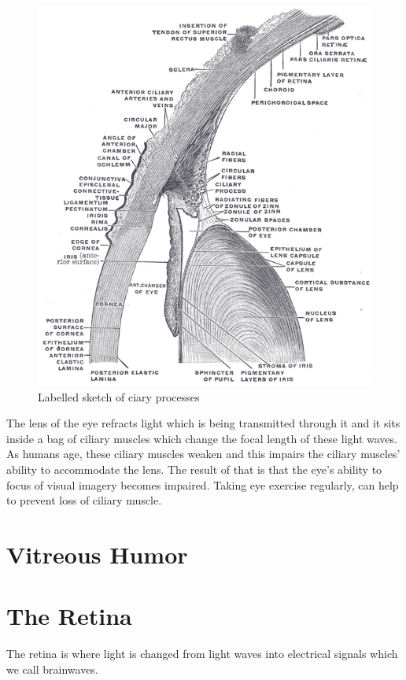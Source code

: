 \begin{figure}[htbp]
  \centering
    \includegraphics{figures/cilary_processes}
  \caption{Labelled sketch of ciary processes}
  \label{fig:cilary_processes}
\end{figure}

The lens of the eye refracts light which is being transmitted through it and it sits inside a bag of ciliary muscles which change the focal length of these
light waves. As humans age, these ciliary muscles weaken and this impairs the ciliary muscles' ability to accommodate the lens. The result of that is that the eye's ability to focus of visual imagery becomes impaired.\cite{} Taking eye exercise regularly, can help to prevent loss of ciliary muscle.

\section{Vitreous Humor}

\section{The Retina}
The retina is where light is changed from light waves into electrical signals
which we call brainwaves.

